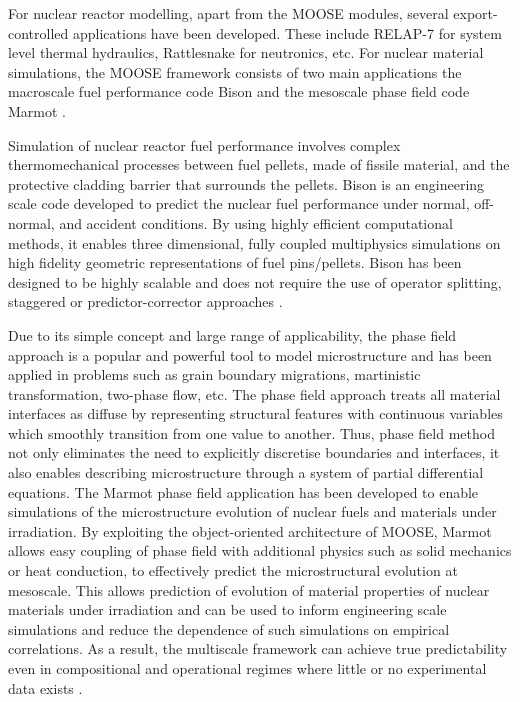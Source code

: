 	For nuclear reactor modelling, apart from the MOOSE modules, several export-controlled applications have been developed. These include {RELAP-7} \cite{Zhang:aa} for system level thermal hydraulics, {Rattlesnake} \cite{Wang:aa} for neutronics, etc. For nuclear material simulations, the {MOOSE} framework consists of two main applications the macroscale fuel performance code {Bison} \cite{WILLIAMSON2012149} and the mesoscale phase field code {Marmot}  \cite{Tonks12}. 
	
	Simulation of nuclear reactor fuel performance involves complex thermomechanical processes between fuel pellets, made of fissile material, and the protective cladding barrier that surrounds the pellets. {Bison} is an engineering scale code developed to predict the nuclear fuel performance under normal, off-normal, and accident conditions. By using highly efficient computational methods, it enables three dimensional, fully coupled multiphysics simulations on high fidelity geometric representations of fuel pins/pellets. {Bison} has been designed to be highly scalable and does not require the use of operator splitting, staggered or predictor-corrector approaches \cite{WILLIAMSON2012149}.

	Due to its simple concept and large range of applicability, the phase field approach is a popular and powerful tool to model microstructure and has been applied in problems such as grain boundary migrations, martinistic transformation, two-phase flow, etc. The phase field approach treats all material interfaces as diffuse by representing structural features with continuous variables which smoothly transition from one value to another. Thus, phase field method not only eliminates the need to explicitly discretise boundaries and interfaces, it also enables describing microstructure through a system of partial differential equations.  The {Marmot} phase field application has been developed to enable simulations of the microstructure evolution of nuclear fuels and materials under irradiation. By exploiting the object-oriented architecture of {MOOSE}, {Marmot} allows easy coupling of phase field with additional physics such as solid mechanics or heat conduction, to effectively predict the microstructural evolution at mesoscale. This allows prediction of evolution of material properties of nuclear materials under irradiation and can be used to inform engineering scale simulations and reduce the dependence of such simulations on empirical correlations. As a result, the multiscale framework can achieve true predictability even in compositional and operational regimes where little or no experimental data exists \cite{Tonks12}.

